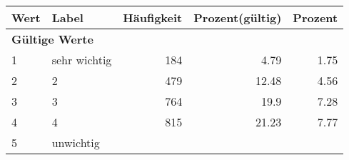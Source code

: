      \begin{longtable}{lXrrr}
     \toprule
     \textbf{Wert} & \textbf{Label} & \textbf{Häufigkeit} & \textbf{Prozent(gültig)} & \textbf{Prozent} \\
     \endhead
     \midrule
     \multicolumn{5}{l}{\textbf{Gültige Werte}}\\

     1 &
     \multicolumn{1}{X}{ sehr wichtig   } &


       \num{184} &
       \num[round-mode=places,round-precision=2]{4.79} &
         \num[round-mode=places,round-precision=2]{1.75} \\

     2 &
     \multicolumn{1}{X}{ 2   } &


       \num{479} &
       \num[round-mode=places,round-precision=2]{12.48} &
         \num[round-mode=places,round-precision=2]{4.56} \\

     3 &
     \multicolumn{1}{X}{ 3   } &


       \num{764} &
       \num[round-mode=places,round-precision=2]{19.9} &
         \num[round-mode=places,round-precision=2]{7.28} \\

     4 &
     \multicolumn{1}{X}{ 4   } &


       \num{815} &
       \num[round-mode=places,round-precision=2]{21.23} &
         \num[round-mode=places,round-precision=2]{7.77} \\

     5 &
     \multicolumn{1}{X}{ unwichtig   } &



\end{longtable}
